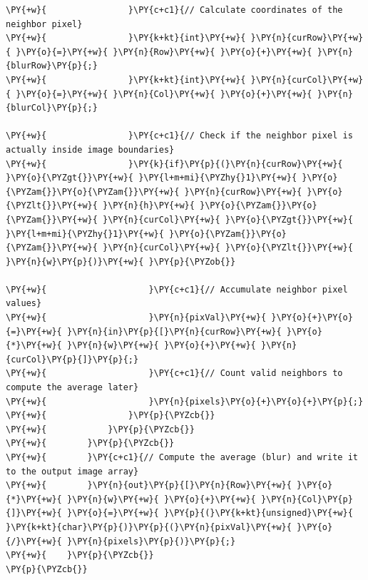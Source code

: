 \begin{Verbatim}[label=\makebox{\url{https://github.com/lucabaldini/cmepda/tree/master/slides/latex/snippets/cuda_box_blur.cu}},commandchars=\\\{\}]
\PY{+w}{                }\PY{c+c1}{// Calculate coordinates of the neighbor pixel}
\PY{+w}{                }\PY{k+kt}{int}\PY{+w}{ }\PY{n}{curRow}\PY{+w}{ }\PY{o}{=}\PY{+w}{ }\PY{n}{Row}\PY{+w}{ }\PY{o}{+}\PY{+w}{ }\PY{n}{blurRow}\PY{p}{;}
\PY{+w}{                }\PY{k+kt}{int}\PY{+w}{ }\PY{n}{curCol}\PY{+w}{ }\PY{o}{=}\PY{+w}{ }\PY{n}{Col}\PY{+w}{ }\PY{o}{+}\PY{+w}{ }\PY{n}{blurCol}\PY{p}{;}

\PY{+w}{                }\PY{c+c1}{// Check if the neighbor pixel is actually inside image boundaries}
\PY{+w}{                }\PY{k}{if}\PY{p}{(}\PY{n}{curRow}\PY{+w}{ }\PY{o}{\PYZgt{}}\PY{+w}{ }\PY{l+m+mi}{\PYZhy{}1}\PY{+w}{ }\PY{o}{\PYZam{}}\PY{o}{\PYZam{}}\PY{+w}{ }\PY{n}{curRow}\PY{+w}{ }\PY{o}{\PYZlt{}}\PY{+w}{ }\PY{n}{h}\PY{+w}{ }\PY{o}{\PYZam{}}\PY{o}{\PYZam{}}\PY{+w}{ }\PY{n}{curCol}\PY{+w}{ }\PY{o}{\PYZgt{}}\PY{+w}{ }\PY{l+m+mi}{\PYZhy{}1}\PY{+w}{ }\PY{o}{\PYZam{}}\PY{o}{\PYZam{}}\PY{+w}{ }\PY{n}{curCol}\PY{+w}{ }\PY{o}{\PYZlt{}}\PY{+w}{ }\PY{n}{w}\PY{p}{)}\PY{+w}{ }\PY{p}{\PYZob{}}

\PY{+w}{                    }\PY{c+c1}{// Accumulate neighbor pixel values}
\PY{+w}{                    }\PY{n}{pixVal}\PY{+w}{ }\PY{o}{+}\PY{o}{=}\PY{+w}{ }\PY{n}{in}\PY{p}{[}\PY{n}{curRow}\PY{+w}{ }\PY{o}{*}\PY{+w}{ }\PY{n}{w}\PY{+w}{ }\PY{o}{+}\PY{+w}{ }\PY{n}{curCol}\PY{p}{]}\PY{p}{;}
\PY{+w}{                    }\PY{c+c1}{// Count valid neighbors to compute the average later}
\PY{+w}{                    }\PY{n}{pixels}\PY{o}{+}\PY{o}{+}\PY{p}{;}
\PY{+w}{                }\PY{p}{\PYZcb{}}
\PY{+w}{            }\PY{p}{\PYZcb{}}
\PY{+w}{        }\PY{p}{\PYZcb{}}
\PY{+w}{        }\PY{c+c1}{// Compute the average (blur) and write it to the output image array}
\PY{+w}{        }\PY{n}{out}\PY{p}{[}\PY{n}{Row}\PY{+w}{ }\PY{o}{*}\PY{+w}{ }\PY{n}{w}\PY{+w}{ }\PY{o}{+}\PY{+w}{ }\PY{n}{Col}\PY{p}{]}\PY{+w}{ }\PY{o}{=}\PY{+w}{ }\PY{p}{(}\PY{k+kt}{unsigned}\PY{+w}{ }\PY{k+kt}{char}\PY{p}{)}\PY{p}{(}\PY{n}{pixVal}\PY{+w}{ }\PY{o}{/}\PY{+w}{ }\PY{n}{pixels}\PY{p}{)}\PY{p}{;}
\PY{+w}{    }\PY{p}{\PYZcb{}}
\PY{p}{\PYZcb{}}
\end{Verbatim}